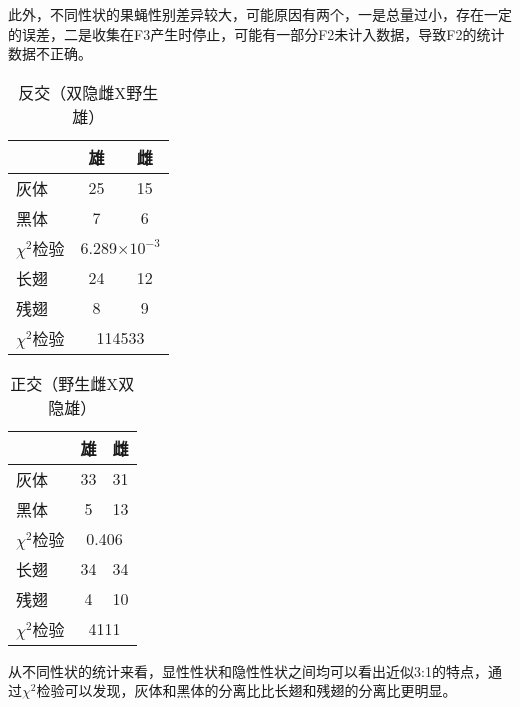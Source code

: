 \documentclass[UTF8]{article}
\begin{document}
    此外，不同性状的果蝇性别差异较大，可能原因有两个，一是总量过小，存在一定的误差，二是收集在F3产生时停止，可能有一部分F2未计入数据，导致F2的统计数据不正确。
    \begin{table}[H]
      \begin{center}
        \caption{反交（双隐雌X野生雄）}
        \begin{tabular}{|l|c|c|}
          \hline
            & \textbf{雄} & \textbf{雌}\\
          \hline
          灰体 & 25 & 15\\
          黑体 & 7 & 6\\
          \hline
          $\chi^2$检验 & \multicolumn{2}{|c|}{6.289$\times 10^{-3}$}\\
          \hline
          长翅 & 24 & 12\\
          残翅 & 8 & 9\\
          \hline
          $\chi^2$检验 & \multicolumn{2}{|c|}{114533}\\
          \hline
        \end{tabular}
      \end{center}
    \end{table}
    \begin{table}[H]
      \begin{center}
        \caption{正交（野生雌X双隐雄）}
        \begin{tabular}{|l|c|c|}
          \hline
            & \textbf{雄} & \textbf{雌}\\
          \hline
          灰体 & 33 & 31\\
          黑体 & 5 & 13\\
          \hline
          $\chi^2$检验 & \multicolumn{2}{|c|}{0.406}\\
          \hline
          长翅 & 34 & 34\\
          残翅 & 4 & 10\\
          \hline
          $\chi^2$检验 & \multicolumn{2}{|c|}{4111}\\
          \hline
        \end{tabular}
      \end{center}
    \end{table}
    从不同性状的统计来看，显性性状和隐性性状之间均可以看出近似3:1的特点，通过$\chi^2$检验可以发现，灰体和黑体的分离比比长翅和残翅的分离比更明显。
\end{document}
